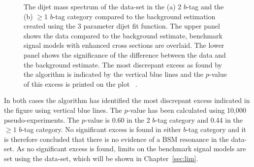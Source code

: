\begin{figure}[!htb]
  \begin{center}
    \captionsetup[subfigure]{aboveskip=0pt,justification=centering}
  \end{center}
  \caption[The dijet mass (\mjj{}) spectrum of the \summer{} data-set in the (a) 2 $b$-tag and the (b) $\geq$1 $b$-tag category
    compared to the background estimation created using the 3 parameter dijet fit function.
    The most discrepant excess as found by the \bh{} algorithm and associated the \mbox{$p$-value} are shown.]
          {The dijet mass spectrum of the  \summer{} data-set in the (a) 2 $b$-tag and the (b) $\geq$1 $b$-tag category
            compared to the background estimation created using the 3 parameter dijet fit function.
            The upper panel shows the data compared to the background estimate,
            benchmark signal models with enhanced cross sections are overlaid.
            The lower panel shows the significance of the difference between the data and the background estimate.
            The most discrepant excess as found by the \bh{} algorithm is indicated by the vertical blue lines and the \mbox{$p$-value} of this excess is printed on the plot
            ~\cite{dibjet-ichep_conf}.
          }
  \label{fig:bkg-summer_searchPhase}
\end{figure}

In both cases the \bh{} algorithm has identified the most discrepant excess indicated
in the figure using vertical blue lines.
The \bh{} \mbox{$p$-value} has been calculated using 10,000 pseudo-experiments.
The \bh{} \mbox{$p$-value} is 0.60 in the 2 $b$-tag category
and 0.44 in the $\geq1$ $b$-tag category.
No significant excess is found in either $b$-tag category and it is therefore concluded
that there is no evidence of a BSM resonance in the \summer{} data-set.
As no significant excess is found, limits on the benchmark signal models are set using the \summer{} data-set,
which will be shown in Chapter~\ref{sec:lim}.

